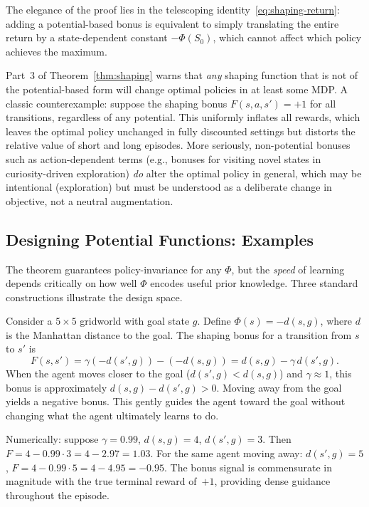 The elegance of the proof lies in the telescoping identity~\eqref{eq:shaping-return}: adding a potential-based bonus is equivalent to simply translating the entire return by a state-dependent constant $-\Phi(S_0)$, which cannot affect which policy achieves the maximum.

\begin{remark}
\label{rem:non-potential}
Part~3 of Theorem~\ref{thm:shaping} warns that \emph{any} shaping function that is not of the potential-based form will change optimal policies in at least some MDP. A classic counterexample: suppose the shaping bonus $F(s,a,s') = +1$ for all transitions, regardless of any potential. This uniformly inflates all rewards, which leaves the optimal policy unchanged in fully discounted settings but distorts the relative value of short and long episodes. More seriously, non-potential bonuses such as action-dependent terms (e.g., bonuses for visiting novel states in curiosity-driven exploration) \emph{do} alter the optimal policy in general, which may be intentional (exploration) but must be understood as a deliberate change in objective, not a neutral augmentation.
\end{remark}

\subsection{Designing Potential Functions: Examples}

The theorem guarantees policy-invariance for any $\Phi$, but the \emph{speed} of learning depends critically on how well $\Phi$ encodes useful prior knowledge. Three standard constructions illustrate the design space.

\begin{example}
\label{ex:grid-potential}
Consider a $5\times 5$ gridworld with goal state $g$. Define $\Phi(s) = -d(s, g)$, where $d$ is the Manhattan distance to the goal. The shaping bonus for a transition from $s$ to $s'$ is
\[
F(s, s') = \gamma(-d(s',g)) - (-d(s,g)) = d(s,g) - \gamma\,d(s',g).
\]
When the agent moves closer to the goal ($d(s',g) < d(s,g)$) and $\gamma \approx 1$, this bonus is approximately $d(s,g) - d(s',g) > 0$. Moving away from the goal yields a negative bonus. This gently guides the agent toward the goal without changing what the agent ultimately learns to do.

Numerically: suppose $\gamma = 0.99$, $d(s,g) = 4$, $d(s',g) = 3$. Then $F = 4 - 0.99 \cdot 3 = 4 - 2.97 = 1.03$. For the same agent moving away: $d(s',g) = 5$, $F = 4 - 0.99 \cdot 5 = 4 - 4.95 = -0.95$. The bonus signal is commensurate in magnitude with the true terminal reward of~$+1$, providing dense guidance throughout the episode.
\end{example}

